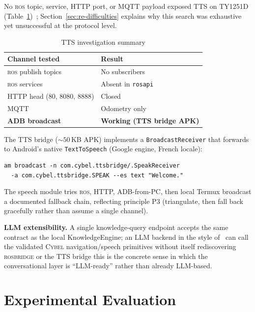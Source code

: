 \documentclass[conference]{IEEEtran}
\newcommand{\ros}{\textsc{ros}}
\newcommand{\rosbridge}{\textsc{rosbridge}}
\newcommand{\rosapi}{\texttt{rosapi}}
\newcommand{\cybel}{\textsc{Cybel}}
\begin{document}
No \ros{} topic, service, HTTP port, or MQTT payload exposed TTS on TY1251D (Table~\ref{tab:tts})~\cite{cybel_tts}; Section~\ref{sec:re-difficulties} explains why this search was exhaustive yet unsuccessful at the protocol level.

\begin{table}[!t]
\caption{TTS investigation summary}
\label{tab:tts}
\centering
\scriptsize
\begin{tabular}{@{}ll@{}}
\toprule
\textbf{Channel tested} & \textbf{Result} \\
\midrule
\ros{} publish topics & No subscribers \\
\ros{} services & Absent in \rosapi{} \\
HTTP head (80, 8080, 8888) & Closed \\
MQTT & Odometry only \\
\textbf{ADB broadcast} & \textbf{Working (TTS bridge APK)} \\
\bottomrule
\end{tabular}
\end{table}

The TTS bridge (${\sim}50$\,KB APK) implements a \texttt{BroadcastReceiver} that forwards to Android's native \texttt{TextToSpeech} (Google engine, French locale):
\begin{footnotesize}
\begin{verbatim}
am broadcast -n com.cybel.ttsbridge/.SpeakReceiver
  -a com.cybel.ttsbridge.SPEAK --es text "Welcome."
\end{verbatim}
\end{footnotesize}

The speech module tries \ros{}, HTTP, ADB-from-PC, then local Termux broadcast a documented fallback chain, reflecting principle P3 (triangulate, then fall back gracefully rather than assume a single channel).

\textbf{LLM extensibility.} A single knowledge-query endpoint accepts the same contract as the local KnowledgeEngine; an LLM backend in the style of~\cite{ahn2022saycan,driess2023paleme} can call the validated \cybel{} navigation/speech primitives without itself rediscovering \rosbridge{} or the TTS bridge this is the concrete sense in which the conversational layer is ``LLM-ready'' rather than already LLM-based.

\section{Experimental Evaluation}
\label{sec:eval}
\end{document}
